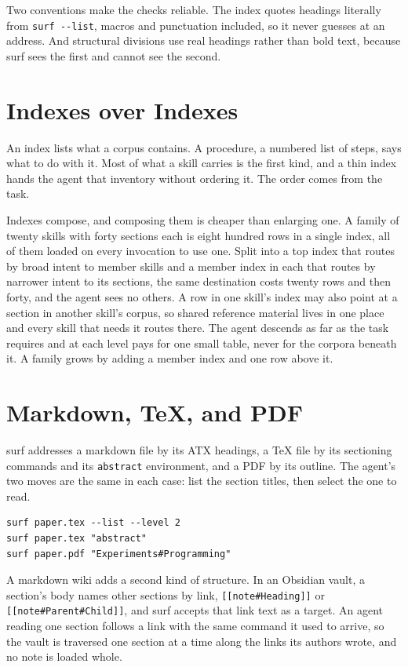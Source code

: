 \documentclass[11pt]{article}
\begin{document}
Two conventions make the checks reliable. The index quotes headings literally
from \texttt{surf -{}-list}, macros and punctuation included, so it never guesses
at an address. And structural divisions use real headings rather than bold text,
because surf sees the first and cannot see the second.

\section{Indexes over Indexes}

An index lists what a corpus contains. A procedure, a numbered list of steps,
says what to do with it. Most of what a skill carries is the first kind, and a
thin index hands the agent that inventory without ordering it. The order comes
from the task.

Indexes compose, and composing them is cheaper than enlarging one. A family of
twenty skills with forty sections each is eight hundred rows in a single index,
all of them loaded on every invocation to use one. Split into a top index that
routes by broad intent to member skills and a member index in each that routes
by narrower intent to its sections, the same destination costs twenty rows and
then forty, and the agent sees no others. A row in one skill's index may also
point at a section in another skill's corpus, so shared reference material lives
in one place and every skill that needs it routes there. The agent descends as
far as the task requires and at each level pays for one small table, never for
the corpora beneath it. A family grows by adding a member index and one row
above it.

\section{Markdown, TeX, and PDF}

surf addresses a markdown file by its ATX headings, a TeX file by its sectioning
commands and its \texttt{abstract} environment, and a PDF by its outline. The
agent's two moves are the same in each case: list the section titles, then
select the one to read.

\begin{Verbatim}
surf paper.tex --list --level 2
surf paper.tex "abstract"
surf paper.pdf "Experiments#Programming"
\end{Verbatim}

A markdown wiki adds a second kind of structure. In an Obsidian vault, a
section's body names other sections by link, \texttt{[[note\#Heading]]} or
\texttt{[[note\#Parent\#Child]]}, and surf accepts that link text as a target.
An agent reading one section follows a link with the same command it used to
arrive, so the vault is traversed one section at a time along the links its
authors wrote, and no note is loaded whole.
\end{document}
